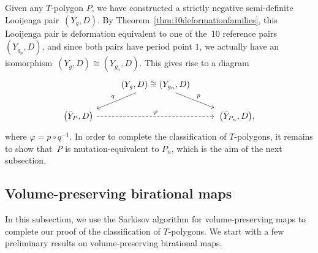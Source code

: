 \documentclass[pdftex]{sigma}
\numberwithin{equation}{section}
\begin{document}
Given any $T$-polygon $P$, we have constructed a strictly negative semi-definite Looijenga pair~$(Y_g, D)$. By Theorem~\ref{thm:10deformationfamilies}, this Looijenga pair is deformation equivalent to one of the~$10$ reference pairs $(Y_{g_n}, D)$, and since both pairs have period point $1$, we actually have an isomorphism~${(Y_g, D) \cong (Y_{g_n}, D)}$.
	This gives rise to a diagram
\[
	\begin{tikzcd}
		&(Y_g, D) \cong (Y_{g_n}, D) \arrow[dr, "p"] \arrow[dl, swap, "q"] & \\
		\bigl(\bar{Y}_{P}, D\bigr) \ar[rr, dashed, "\varphi"]&&\, \bigl(\bar{Y}_{P_n}, D\bigr),
	\end{tikzcd}
	\]
	where $\varphi=p \circ q^{-1}$. In order to complete the classification of $T$-polygons, it remains to show that~$P$ is mutation-equivalent to $P_n$, which is the aim of the next subsection.

	\subsection{Volume-preserving birational maps}\label{sec:sarkisov}
In this subsection, we use the Sarkisov algorithm for volume-preserving maps \cite[Proposition~3.27]{HackingKeating} to complete our proof of the classification of $T$-polygons.
We start with a few preliminary results on volume-preserving birational maps.
\end{document}
